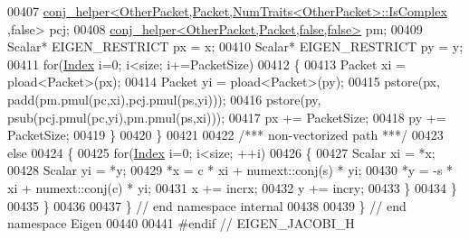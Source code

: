\begin{DoxyCode}
00407     \hyperlink{struct_eigen_1_1internal_1_1conj__helper}{conj\_helper<OtherPacket,Packet,NumTraits<OtherPacket>::IsComplex}
      ,\textcolor{keyword}{false}> pcj;
00408     \hyperlink{struct_eigen_1_1internal_1_1conj__helper}{conj\_helper<OtherPacket,Packet,false,false>} pm;
00409     Scalar* EIGEN\_RESTRICT px = x;
00410     Scalar* EIGEN\_RESTRICT py = y;
00411     \textcolor{keywordflow}{for}(\hyperlink{namespace_eigen_a62e77e0933482dafde8fe197d9a2cfde}{Index} i=0; i<size; i+=PacketSize)
00412     \{
00413       Packet xi = pload<Packet>(px);
00414       Packet yi = pload<Packet>(py);
00415       pstore(px, padd(pm.pmul(pc,xi),pcj.pmul(ps,yi)));
00416       pstore(py, psub(pcj.pmul(pc,yi),pm.pmul(ps,xi)));
00417       px += PacketSize;
00418       py += PacketSize;
00419     \}
00420   \}
00421 
00422   \textcolor{comment}{/*** non-vectorized path ***/}
00423   \textcolor{keywordflow}{else}
00424   \{
00425     \textcolor{keywordflow}{for}(\hyperlink{namespace_eigen_a62e77e0933482dafde8fe197d9a2cfde}{Index} i=0; i<size; ++i)
00426     \{
00427       Scalar xi = *x;
00428       Scalar yi = *y;
00429       *x =  c * xi + numext::conj(s) * yi;
00430       *y = -s * xi + numext::conj(c) * yi;
00431       x += incrx;
00432       y += incry;
00433     \}
00434   \}
00435 \}
00436 
00437 \} \textcolor{comment}{// end namespace internal}
00438 
00439 \} \textcolor{comment}{// end namespace Eigen}
00440 
00441 \textcolor{preprocessor}{#endif // EIGEN\_JACOBI\_H}
\end{DoxyCode}
